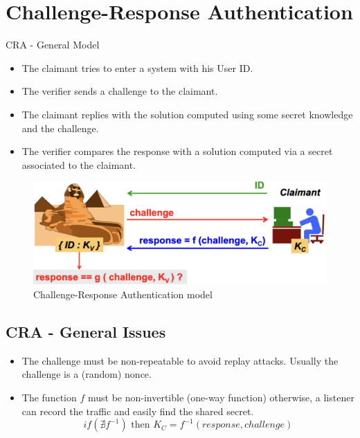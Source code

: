 \section{Challenge-Response Authentication}
\begin{center}
    CRA - General Model
\end{center}


\begin{multicols}{2}
\begin{itemize}
    \item The claimant tries to enter a system with his User ID.
    \item The verifier sends a challenge to the claimant.
    \item The claimant replies with the solution computed using some secret knowledge and the challenge.
    \item The verifier compares the response with a solution computed  via a secret associated to the claimant.
\end{itemize}

\columnbreak

    \begin{figure}[H]
        \centering
        \includegraphics[width=\linewidth]{Images/Authentication/CRA.png}
        \caption{Challenge-Response Authentication model}
    \end{figure}
\end{multicols}

\subsection*{CRA - General Issues}
\begin{itemize}
    \item The challenge must be non-repeatable to avoid replay attacks. Usually the challenge is a (random) nonce.
    \item The function $f$ must be non-invertible (one-way function) otherwise, a listener can record the traffic and easily find the shared secret.
    \[
        if(\nexists f^{-1}) \text{ then } K_C = f^{-1} (response, challenge)
    \]
\end{itemize}

